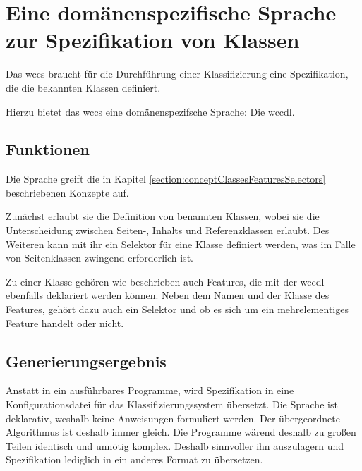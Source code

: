 \section{Eine domänenspezifische Sprache zur Spezifikation von Klassen}
    Das \gls{wccs} braucht für die Durchführung einer Klassifizierung
    eine Spezifikation, die die bekannten Klassen definiert.

    Hierzu bietet das \gls{wccs} eine domänenspezifsche Sprache:
    Die \gls{wccdl}.

    \subsection{Funktionen}
        Die Sprache greift die in Kapitel \ref{section:conceptClassesFeaturesSelectors}
        beschriebenen Konzepte auf.

        Zunächst erlaubt sie die Definition von benannten Klassen,
        wobei sie die Unterscheidung zwischen Seiten-, Inhalts und Referenzklassen
        erlaubt.
        Des Weiteren kann mit ihr ein Selektor für eine Klasse definiert werden,
        was im Falle von Seitenklassen zwingend erforderlich ist.

        Zu einer Klasse gehören wie beschrieben auch Features,
        die mit der \gls{wccdl} ebenfalls deklariert werden können.
        Neben dem Namen und der Klasse des Features, gehört dazu auch
        ein Selektor und ob es sich um ein mehrelementiges Feature handelt oder nicht.


    \subsection{Generierungsergebnis}
        Anstatt in ein ausführbares Programme, wird Spezifikation in eine Konfigurationsdatei für
        das Klassifizierungssystem übersetzt.
        Die Sprache ist deklarativ, weshalb keine Anweisungen formuliert werden.
        Der übergeordnete Algorithmus ist deshalb immer gleich.
        Die Programme wärend deshalb zu großen Teilen identisch und unnötig komplex.
        Deshalb sinnvoller ihn auszulagern und Spezifikation lediglich in ein anderes Format zu übersetzen.

